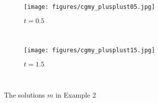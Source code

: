 \documentclass[a4paper,  twoside, 10pt, leqno]{amsart}
\theoremstyle{remark}
\theoremstyle{definition}
\begin{document}
\begin{figure}[ht!]
    \centering
    \begin{subfigure}[b]{0.49\textwidth}
        \texttt{[image: figures/cgmy\_plusplust05.jpg]}
        \caption{$t=0.5$}
        \label{fig:deg_t05}
    \end{subfigure}
    ~ %
    \begin{subfigure}[b]{0.49\textwidth}
        \texttt{[image: figures/cgmy\_plusplust15.jpg]}
        \caption{$t=1.5$}
        \label{fig:deg_t15}
    \end{subfigure}
    ~ %
    \caption{The solutions $m$ in Example 2}\label{fig:deg_diff}
\end{figure}
\end{document}
